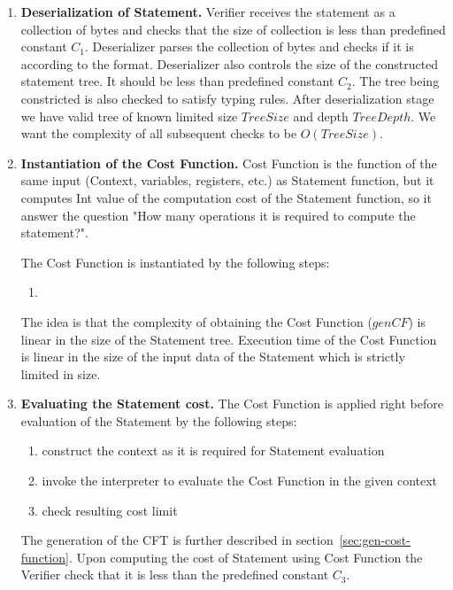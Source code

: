 \documentclass[11pt]{article}
\begin{document}
\begin{enumerate}
\item \textbf{Deserialization of Statement.}
Verifier receives the statement as a collection of bytes and checks that the
size of collection is less than predefined constant $C_1$. Deserializer parses
the collection of bytes and checks if it is according to the format.
Deserializer also controls the size of the constructed statement tree. It should
be less than predefined constant $C_2$. The tree being constricted is also
checked to satisfy typing rules. After deserialization stage we have valid tree
of known limited size $TreeSize$ and depth $TreeDepth$. We want the complexity
of all subsequent checks to be $O(TreeSize)$.

\item \textbf{Instantiation of the Cost Function.}
Cost Function is the function of the same input (Context, variables,
registers, etc.) as Statement function, but it computes Int value of the
computation cost of the Statement function, so it answer the question "How
many operations it is required to compute the statement?". 

The Cost Function is instantiated by the following steps:
    \begin{enumerate}
        \item{}
    \end{enumerate}

 The idea is that the complexity of obtaining the Cost Function ($genCF$) is
 linear in the size of the Statement tree. Execution time of the Cost Function
 is linear in the size of the input data of the Statement which is strictly
 limited in size.

\item \textbf{Evaluating the Statement cost.}
The Cost Function is applied right before evaluation of the Statement by the
following steps:
    \begin{enumerate}
        \item construct the context as it is required for Statement evaluation 
        \item invoke the interpreter to evaluate the Cost Function in the
        given context
        \item check resulting cost limit
    \end{enumerate}

The generation of the CFT is further described in
section~\ref{sec:gen-cost-function}. Upon computing the cost of Statement
using Cost Function the Verifier check that it is less than the predefined
constant $C_3$.
\end{enumerate}
\end{document}
